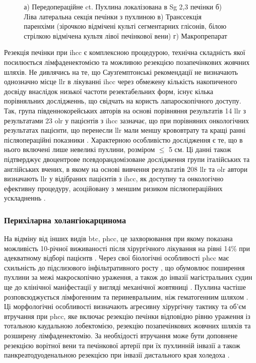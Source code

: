 \begin{refsection}
\begin{figure}[h]
\medskip
\small
а) Передопераційне \acrshort{ct}. Пухлина локалізована в Sg 2,3 печінки б) Ліва латеральна секція печінки з пухлиною  в) Транссекція паренхіми (зірочкою відмічені культі сегментарних глісонів, білою стрілкою відмічена культя лівої печінкової вени)  г) Макропрепарат 

\end{figure}

Резекція печінки при \acrshort{ihcc} є комплексною процедурою, технічна складність якої посилюється лімфаденектомією та можливою резекцією позапечінкових жовчних шляхів. Не дивлячись на те, що Саузґемптонські рекомендації не визначають однозначно місце \acrshort{llr} в лікуванні \acrshort{ihcc} через обмежену кількість накопиченого досвіду внаслідок низької частоти резектабельних форм, існує кілька порівняльних дослідженнь, що свідчать на користь лапароскопічного доступу. Так, група південнокорейських авторів на основі порівняння результатів 14 \acrshort{llr} з результатами 23 \acrshort{olr} у пацієнтів з \acrshort{ihcc} зазначає, що при порівняних онкологічних результатах пацієнти, що перенесли \acrshort{llr} мали меншу крововтрату та кращі ранні післяопераційні показники \cite{Lee2016a}. Характерною особливістю дослідження є те, що в нього включені лише невеликі пухлини, розміром $\leq$ 5 см. Ці данні також підтверджує двоцентрове псевдорандомізоване дослідження групи італійських та англійських вчених, в якому на основі вивчення результатів 208 \acrshort{llr} та \acrshort{olr} автори визначають \acrshort{llr} у відібраних пацієнтів  з \acrshort{ihcc}, як доступну та онкологічно ефективну процедуру, асоційовану з меншим ризиком післяопераційних ускладненнь \cite{Ratti2020}.


\subsubsection{Перихіларна холангіокарцинома}

На відміну від інших видів \acrshort{btc}, \acrshort{phcc}, це захворювання при якому показана можливість 10-річної виживаності після хірургічного лікування на рівні 14\% при адекватному відборі пацієнтв \cite{Juntermanns2019}. Через свої біологічні особливості \acrshort{phcc} має схильність до підслизового інфільтративного росту \cite{Sakamoto1998}, що обумовлює поширення пухлини за межі макроскопічно ураження, а також до інвазії магістральних судин ще до клінічної маніфестації у вигляді механічної жовтяниці \cite{Shimada2003}. Пухлина частіше розповсюджується лімфогенним та периневральним, ніж гематогенним шляхом \cite{Zimmermann2017}. Ці морфологічні особливості визначають агресивну хірургічну тактику та об'єм  втручання при \acrshort{phcc}, яке включає резекцію печінки відповідно рівню ураження із тотальною каудальною лобектомією, резекцію позапечінкових жовчних шляхів та розширену лімфаденектомію. За необхідості втручання може бути доповнене резекцією ворітної вени та печінкової артерії при їх пухлинній інвазії а також панкреатодуоденальною резекцією при інвазії дистального края холедоха \cite{Mizuno2019}. 


\end{refsection}
